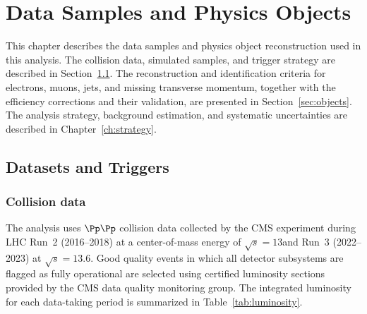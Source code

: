 \chapter{Data Samples and Physics Objects}
\label{ch:reconstruction}

This chapter describes the data samples and physics object reconstruction used in this analysis. The collision data, simulated samples, and trigger strategy are described in Section~\ref{sec:datasets}. The reconstruction and identification criteria for electrons, muons, jets, and missing transverse momentum, together with the efficiency corrections and their validation, are presented in Section~\ref{sec:objects}. The analysis strategy, background estimation, and systematic uncertainties are described in Chapter~\ref{ch:strategy}.

\section{Datasets and Triggers}
\label{sec:datasets}

\subsection{Collision data}
\label{ssec:collision_data}

The analysis uses $\Pp\Pp$ collision data collected by the CMS experiment during LHC Run~2 (2016--2018) at a center-of-mass energy of $\sqrt{s} = 13$\TeV and Run~3 (2022--2023) at $\sqrt{s} = 13.6$\TeV. Good quality events in which all detector subsystems are flagged as fully operational are selected using certified luminosity sections provided by the CMS data quality monitoring group. The integrated luminosity for each data-taking period is summarized in Table~\ref{tab:luminosity}.

